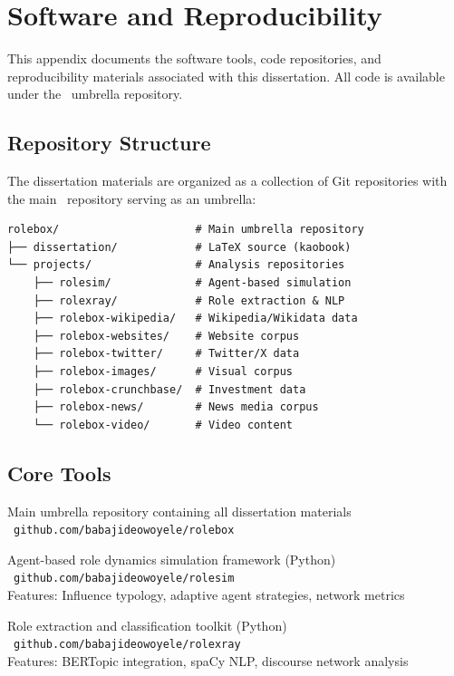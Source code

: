 \documentclass[../main.tex]{subfiles}
\begin{document}

\chapter{Software and Reproducibility}

This appendix documents the software tools, code repositories, and reproducibility materials associated with this dissertation. All code is available under the \RoleBox\ umbrella repository.

\section{Repository Structure}

The dissertation materials are organized as a collection of Git repositories with the main \RoleBox\ repository serving as an umbrella:

\begin{kaobox}[title=Repository Architecture]
\begin{verbatim}
rolebox/                     # Main umbrella repository
├── dissertation/            # LaTeX source (kaobook)
└── projects/                # Analysis repositories
    ├── rolesim/             # Agent-based simulation
    ├── rolexray/            # Role extraction & NLP
    ├── rolebox-wikipedia/   # Wikipedia/Wikidata data
    ├── rolebox-websites/    # Website corpus
    ├── rolebox-twitter/     # Twitter/X data
    ├── rolebox-images/      # Visual corpus
    ├── rolebox-crunchbase/  # Investment data
    ├── rolebox-news/        # News media corpus
    └── rolebox-video/       # Video content
\end{verbatim}
\end{kaobox}

\section{Core Tools}

\begin{description}[leftmargin=0.5cm]

\item[\RoleBox] Main umbrella repository containing all dissertation materials\\
\faGithub\ \texttt{github.com/babajideowoyele/rolebox}

\item[\RoleSim] Agent-based role dynamics simulation framework (Python)\\
\faGithub\ \texttt{github.com/babajideowoyele/rolesim}\\
Features: Influence typology, adaptive agent strategies, network metrics

\item[RoleXray] Role extraction and classification toolkit (Python)\\
\faGithub\ \texttt{github.com/babajideowoyele/rolexray}\\
Features: BERTopic integration, spaCy NLP, discourse network analysis

\end{description}
\end{document}
